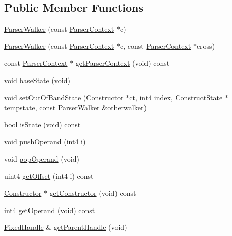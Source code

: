\subsection*{Public Member Functions}
\begin{DoxyCompactItemize}
\item 
\mbox{\hyperlink{class_parser_walker_a2409e0f0840b4361c256315b5e537344}{Parser\+Walker}} (const \mbox{\hyperlink{class_parser_context}{Parser\+Context}} $\ast$c)
\item 
\mbox{\hyperlink{class_parser_walker_a683f36ca664f0cbab7f6125084c00de8}{Parser\+Walker}} (const \mbox{\hyperlink{class_parser_context}{Parser\+Context}} $\ast$c, const \mbox{\hyperlink{class_parser_context}{Parser\+Context}} $\ast$cross)
\item 
const \mbox{\hyperlink{class_parser_context}{Parser\+Context}} $\ast$ \mbox{\hyperlink{class_parser_walker_a3468c4fffb0a6ab229883ac9769e46f2}{get\+Parser\+Context}} (void) const
\item 
void \mbox{\hyperlink{class_parser_walker_a63fb34fd3dee860df4b182351dd935b0}{base\+State}} (void)
\item 
void \mbox{\hyperlink{class_parser_walker_a917b2a69e5a2d62857666389d95bf757}{set\+Out\+Of\+Band\+State}} (\mbox{\hyperlink{class_constructor}{Constructor}} $\ast$ct, int4 index, \mbox{\hyperlink{struct_construct_state}{Construct\+State}} $\ast$tempstate, const \mbox{\hyperlink{class_parser_walker}{Parser\+Walker}} \&otherwalker)
\item 
bool \mbox{\hyperlink{class_parser_walker_aea8bce30faf92826fd7e6ba1512fb66f}{is\+State}} (void) const
\item 
void \mbox{\hyperlink{class_parser_walker_a0935e6c14cfdcb9657a440cef7ee40ef}{push\+Operand}} (int4 i)
\item 
void \mbox{\hyperlink{class_parser_walker_a086ef7fa7018c8133d93df96a9dde6d9}{pop\+Operand}} (void)
\item 
uint4 \mbox{\hyperlink{class_parser_walker_add81e215f1dd3cdc87f6d9e78de818ad}{get\+Offset}} (int4 i) const
\item 
\mbox{\hyperlink{class_constructor}{Constructor}} $\ast$ \mbox{\hyperlink{class_parser_walker_a3d8f48e605938ba8faef8a92cb816b4f}{get\+Constructor}} (void) const
\item 
int4 \mbox{\hyperlink{class_parser_walker_abf73ef90d42aeea7f3e9fb96eb9ad08e}{get\+Operand}} (void) const
\item 
\mbox{\hyperlink{struct_fixed_handle}{Fixed\+Handle}} \& \mbox{\hyperlink{class_parser_walker_a29772169263a35683724c03d90372734}{get\+Parent\+Handle}} (void)

\end{DoxyCompactItemize}
